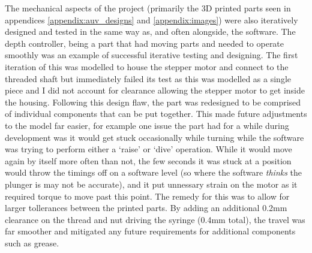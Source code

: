 \documentclass[11pt,a4paper,titlepage]{report}
\begin{document}
	The mechanical aspects of the project (primarily the 3D printed parts seen in appendices \ref{appendix:auv_designs} and \ref{appendix:images}) were also iteratively designed and tested in the same way as, and often alongside, the software. The depth controller, being a part that had moving parts and needed to operate smoothly was an example of successful iterative testing and designing. The first iteration of this was modelled to house the stepper motor and connect to the threaded shaft but immediately failed its test as this was modelled as a single piece and I did not account for clearance allowing the stepper motor to get inside the housing. Following this design flaw, the part was redesigned to be comprised of individual components that can be put together. This made future adjustments to the model far easier, for example one issue the part had for a while during development was it would get stuck occasionally while turning while the software was trying to perform either a `raise' or `dive' operation. While it would move again by itself more often than not, the few seconds it was stuck at a position would throw the timings off on a software level (so where the software \textit{thinks} the plunger is may not be accurate), and it put unnessary strain on the motor as it required torque to move past this point. The remedy for this was to allow for larger tollerances between the printed parts. By adding an additional 0.2\unit{\milli\metre} clearance on the thread and nut driving the syringe (0.4\unit{\milli\metre} total), the travel was far smoother and mitigated any future requirements for additional components such as grease. 
	
\end{document}
